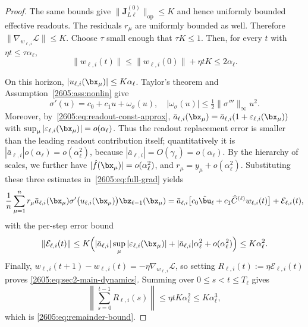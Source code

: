 \begin{proof}
The same bounds give \(\|\bm J_{L\ell}^{(0)}\|_{\mathrm{op}}\le K\) and hence
uniformly bounded effective readouts.  The residuals \(r_\mu\) are uniformly
bounded as well.  Therefore
\(\|\nabla_{w_{\ell,i}}\mathcal L\|\le K\).  Choose \(\tau\) small enough that
\(\tau K\le 1\).  Then, for every
$t$ with $\eta t\le \tau\alpha_\ell$,
\[
\|w_{\ell,i}(t)\|
\le \|w_{\ell,i}(0)\|+\eta tK
\le 2\alpha_\ell .
\]

On this horizon,
\(|u_{\ell,i}(\bx_\mu)|\le K\alpha_\ell\).  Taylor's theorem and
Assumption~\ref{2605:ass:nonlin} give
\begin{equation}\label{2605:eq:sec2-sigma-linearization}
\sigma'(u) = c_0 + c_1 u + \omega_\sigma(u),\quad
|\omega_\sigma(u)|\leq \tfrac{1}{2}\|\sigma'''\|_\infty u^2 .
\end{equation}
Moreover, by~\eqref{2605:eq:readout-const-approx},
\(\bar a_{\ell,i}(\bx_\mu)=\bar a_{\ell,i}(1+\varepsilon_{\ell,i}(\bx_\mu))\)
with \(\sup_\mu|\varepsilon_{\ell,i}(\bx_\mu)|=o(\alpha_\ell)\).  Thus the
readout replacement error is smaller than the leading readout contribution
itself; quantitatively it is
\(|\bar a_{\ell,i}| o(\alpha_\ell)=o(\alpha_\ell^2)\), because
\(|\bar a_{\ell,i}|=O(\gamma_\ell)=o(\alpha_\ell)\).  By the hierarchy of scales, we further have
$|\hat f(\bx_\mu)|=o(\alpha_\ell^2)$, and
$r_\mu=y_\mu+o(\alpha_\ell^2)$.
Substituting these three estimates in~\eqref{2605:eq:full-grad} yields
\[
\frac1n\sum_{\mu=1}^n
r_\mu \bar a_{\ell,i}(\bx_\mu) 
\sigma' \bigl(u_{\ell,i}(\bx_\mu)\bigr) \bz_{\ell-1}(\bx_\mu)
=
\bar a_{\ell,i}\bigl[c_0\hat{\bu}_\ell
+c_1\widehat C^{(\ell)}w_{\ell,i}(t)\bigr]
+\mathcal E_{\ell,i}(t),
\]
with the per-step error bound
\[
\|\mathcal E_{\ell,i}(t)\|
\le
K\Bigl(
    |\bar a_{\ell,i}| \sup_\mu|\varepsilon_{\ell,i}(\bx_\mu)|
    + |\bar a_{\ell,i}|\alpha_\ell^2
    + o(\alpha_\ell^2)
\Bigr)
\le K\alpha_\ell^2 .
\]
Finally,
$w_{\ell,i}(t+1)-w_{\ell,i}(t)=-\eta\nabla_{w_{\ell,i}}\mathcal L$, so setting
$R_{\ell,i}(t):=\eta\mathcal E_{\ell,i}(t)$ proves
\eqref{2605:eq:sec2-main-dynamics}.  Summing over \(0\le s<t\le T_\ell\) gives
\[
    \left\|
        \sum_{s=0}^{t-1}R_{\ell,i}(s)
    \right\|
    \le
    \eta t K\alpha_\ell^2
    \le
    K\alpha_\ell^3,
\]
which is \eqref{2605:eq:remainder-bound}.
\end{proof}
